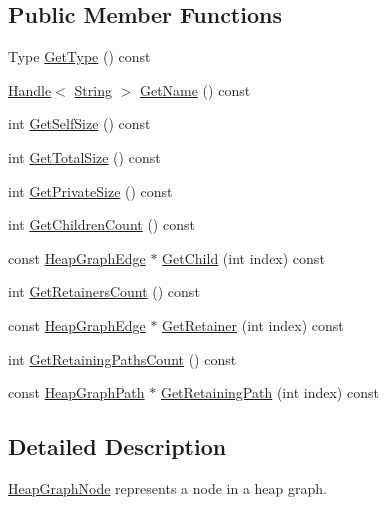 \subsection*{Public Member Functions}
\begin{DoxyCompactItemize}
\item 
Type \hyperlink{classv8_1_1_heap_graph_node_a5e07fc855bded52229e62b855fa08c5d}{Get\+Type} () const 
\item 
\hyperlink{classv8_1_1_handle}{Handle}$<$ \hyperlink{classv8_1_1_string}{String} $>$ \hyperlink{classv8_1_1_heap_graph_node_af5f24ee6c07a57814e18bd317cb5576a}{Get\+Name} () const 
\item 
int \hyperlink{classv8_1_1_heap_graph_node_acd3bd8860aa399ac56fa8a0229af7b85}{Get\+Self\+Size} () const 
\item 
int \hyperlink{classv8_1_1_heap_graph_node_af2621cf83d9e06ce1f45a4c207f3475b}{Get\+Total\+Size} () const 
\item 
int \hyperlink{classv8_1_1_heap_graph_node_ac010b7bb0f9e3821604235a61429ab87}{Get\+Private\+Size} () const 
\item 
int \hyperlink{classv8_1_1_heap_graph_node_a0a49abe006755dd5536d15ae42f552d4}{Get\+Children\+Count} () const 
\item 
const \hyperlink{classv8_1_1_heap_graph_edge}{Heap\+Graph\+Edge} $\ast$ \hyperlink{classv8_1_1_heap_graph_node_ac3435611573e58b6614aeaab68442905}{Get\+Child} (int index) const 
\item 
int \hyperlink{classv8_1_1_heap_graph_node_a9de00d0733343b4b16823654813c22a1}{Get\+Retainers\+Count} () const 
\item 
const \hyperlink{classv8_1_1_heap_graph_edge}{Heap\+Graph\+Edge} $\ast$ \hyperlink{classv8_1_1_heap_graph_node_a260c115d00b7960a08ea34c6a8bee058}{Get\+Retainer} (int index) const 
\item 
int \hyperlink{classv8_1_1_heap_graph_node_a9d1d049b6ecbc94d2753f10af782ba83}{Get\+Retaining\+Paths\+Count} () const 
\item 
const \hyperlink{classv8_1_1_heap_graph_path}{Heap\+Graph\+Path} $\ast$ \hyperlink{classv8_1_1_heap_graph_node_a0145bac669b571f6ed3e04722402468c}{Get\+Retaining\+Path} (int index) const 
\end{DoxyCompactItemize}


\subsection{Detailed Description}
\hyperlink{classv8_1_1_heap_graph_node}{Heap\+Graph\+Node} represents a node in a heap graph. 

